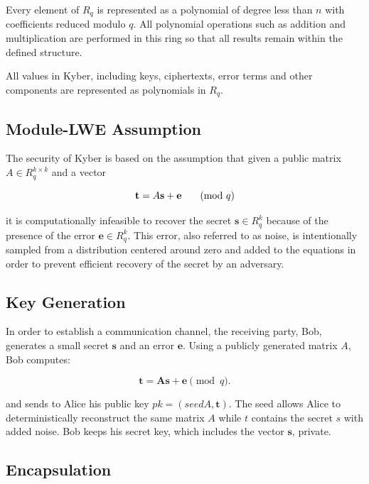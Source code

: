 \documentclass[12pt]{article}
\begin{document}
Every element of \( R_q\) is represented as a polynomial of degree less than \( n \) with coefficients reduced modulo \(q\). All polynomial operations such as addition and multiplication are performed in this ring so that all results remain within the defined structure.

All values in Kyber, including keys, ciphertexts, error terms and other components are represented as polynomials in \( R_q\).

\subsection*{Module-LWE Assumption}

The security of Kyber is based on the assumption that given a public matrix \( A \in R_q^{k \times k} \) and a vector 

\begin{equation}
\mathbf{t} = A \mathbf{s} + \mathbf{e} \hspace{0.5cm}   \pmod{q}
\end{equation}

it is computationally infeasible to recover the secret \( \mathbf{s} \in R_q^k \)  because of the presence of the error \(\mathbf{e} \in R_q^k \). This error, also referred to as noise, is intentionally sampled from a distribution centered around zero and added to the equations in order to prevent efficient recovery of the secret by an adversary.

\subsection*{Key Generation}

In order to establish a communication channel, the receiving party, Bob, generates a small secret \(\mathbf{s}\) and an error \( \mathbf{e} \). Using a publicly generated matrix \(A\), Bob computes:

\begin{equation}
\mathbf{t} = \mathbf{A} \mathbf{s} + \mathbf{e} \pmod{q}.
\end{equation}

and sends to Alice his public key \(pk = (seedA, \mathbf{t})\). The seed allows Alice to deterministically reconstruct the same matrix \(A\) while \(t\) contains the secret \(s\) with added noise. Bob keeps his secret key, which includes the vector \(\mathbf{s}\), private. 

\subsection*{Encapsulation}
\end{document}
